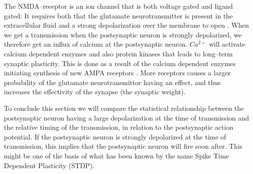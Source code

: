 The NMDA--receptor is an ion channel that is both voltage gated and ligand gated: 
	It requires both that the glutamate neurotransmitter is present in the extracellular fluid and a strong depolarization over the membrane to open \cite{PrinciplesOfNeuralScience4edKAP12}. 
When we get a transmission when the postsynaptic neuron is strongly depolarized, we therefore get an influx of calcium at the postsynaptic neuron.
$Ca^{2+}$ will activate calcium dependent enzymes and also protein kinases that leads to long--term synaptic plasticity\cite{PrinciplesOfNeuralScience4edKAP12}.
This is done as a result of the calcium dependent enzymes initiating synthesis of new AMPA receptors \cite{AMPARtrafficingArtikkel}. 
More receptors causes a larger probability of the glutamate neurotransmittor having an effect, and thus increases the effectivity of the synapse (the synaptic weight).

To conclude this section we will compare the statistical relationship between the postsynaptic neuron having a large depolarization at the time of transmission and the relative timing of the transmission, 
	in relation to the postsynaptic action potential. 
If the postsynaptic neuron is strongly depolarized at the time of transmission, this implies that the postsynaptic neuron will fire soon after.
This might be one of the basis of what has been known by the name Spike Time Dependent Plasticity (STDP).



